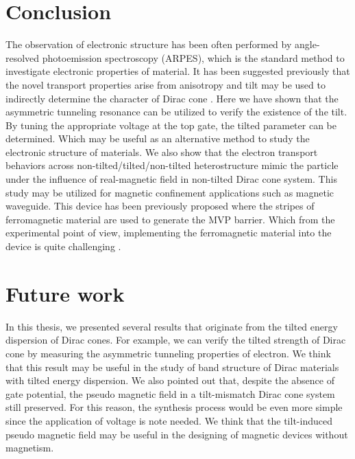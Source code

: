 \section{Conclusion}
    The observation of electronic structure has been often performed by angle-resolved photoemission spectroscopy (ARPES), which is the standard method to investigate electronic properties of material. 
    It has been suggested previously that the novel transport properties arise from anisotropy and tilt may be used to indirectly determine the character of Dirac cone \cite{Zhang2018b}. 
    Here we have shown that the asymmetric tunneling resonance can be utilized to verify the existence of the tilt. 
    By tuning the appropriate voltage at the top gate, the tilted parameter can be determined. 
    Which may be useful as an alternative method to study the electronic structure of materials. 
    We also show that the electron transport behaviors across non-tilted/tilted/non-tilted heterostructure mimic the particle under the influence of real-magnetic field in non-tilted Dirac cone system. 
    This study may be utilized for magnetic confinement applications such as magnetic waveguide. 
    This device has been previously proposed where the stripes of ferromagnetic material are used to generate the MVP barrier. 
    Which from the experimental point of view, implementing the ferromagnetic material into the device is quite challenging \cite{Awschalom2009}. 
    

\section{Future work}
    In this thesis, we presented several results that originate from the tilted energy dispersion of Dirac cones.
    For example, we can verify the tilted strength of Dirac cone by measuring the asymmetric tunneling properties of electron.
    We think that this result may be useful in the study of band structure of Dirac materials with tilted energy dispersion.
    We also pointed out that, despite the absence of gate potential, the pseudo magnetic field in a tilt-mismatch Dirac cone system still preserved.
    For this reason, the synthesis process would be even more simple since the application of voltage is note needed.  
    We think that the tilt-induced pseudo magnetic field may be useful in the designing of magnetic devices without magnetism. 

